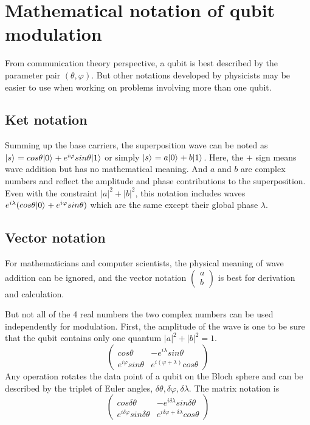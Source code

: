 \documentclass[Letter,11pt]{book}
\begin{document}
\section{Mathematical notation of qubit modulation}
From communication theory perspective, a qubit is best described by the parameter pair $(\theta, \varphi)$. But other notations developed by physicists may be easier to use when working on problems involving more than one qubit. 
\subsection{Ket notation}
Summing up the base carriers, the superposition wave can be noted as $\vert {s} \rangle_{} = cos{\theta} \vert {0} \rangle_{} + e^{i \varphi} sin{\theta} \vert {1} \rangle_{}$ or simply $\vert {s} \rangle_{} = a \vert {0} \rangle_{} + b \vert {1} \rangle_{}$. Here, the $+$ sign means wave addition but has no mathematical meaning. And $a$ and $b$ are complex numbers and reflect the amplitude and phase contributions to the superposition. Even with the constraint $|a|^2+ |b|^2$, this notation includes waves $e^{i\lambda} (cos{\theta} \vert {0} \rangle_{} + e^{i \varphi} sin{\theta})$ which are the same except their global phase $\lambda$.

\subsection{Vector notation}
For mathematicians and computer scientists, the physical meaning of wave addition can be ignored, and the vector notation $
\begin{pmatrix}
    a \\
    b
\end{pmatrix}$ is best for derivation and calculation.

But not all of the 4 real numbers the two complex numbers can be used independently for modulation. First, the amplitude of the wave is one to be sure that the qubit contains only one quantum $|a|^2 + |b|^2 = 1$.
\begin{equation}
    \begin{pmatrix}
    cos\theta & -e^{i\lambda} sin\theta \\
    e^{i\varphi} sin\theta & e^{i(\varphi + \lambda)} cos\theta
\end{pmatrix}
\end{equation}
Any operation rotates the data point of a qubit on the Bloch sphere and can be described by the triplet of Euler angles, $\delta \theta, \delta \varphi, \delta \lambda$. The matrix notation is
\begin{equation}
    \begin{pmatrix}
        cos\delta \theta & -e^{i\delta \lambda} sin\delta \theta \\
        e^{i \delta \varphi} sin\delta \theta & e^{i \delta \varphi+ \delta \lambda} cos\theta 
    \end{pmatrix}
\end{equation}
\end{document}
